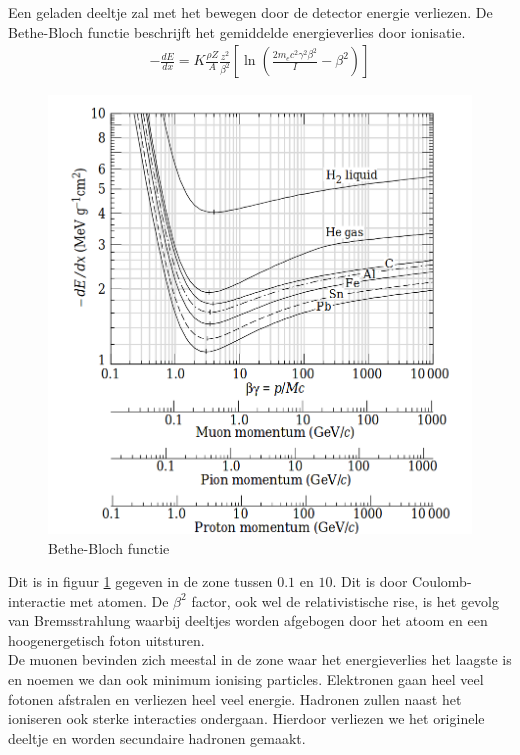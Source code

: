 \documentclass[../main.tex]{subfiles}
\begin{document}
Een geladen deeltje zal met het bewegen door de detector energie verliezen. De Bethe-Bloch functie beschrijft het gemiddelde energieverlies door ionisatie.
\begin{equation}
    \begin{aligned}
        \label{eq:bethe_bloch}
        -\frac{dE}{dx}=K\frac{\rho Z}{A}\frac{z^2}{\beta^2}\left[\ln\left(\frac{2m_ec^2\gamma^2\beta^2}{I}-\beta^2\right)\right]
    \end{aligned}
\end{equation}

\begin{figure}[h]
    \centering
    \includegraphics[width=0.8\linewidth]{introduction_and_review/bethe_bloch.png}
    \caption{Bethe-Bloch functie}%
    \label{fig:bethe_bloch}
\end{figure}
Dit is in figuur \ref{fig:bethe_bloch} gegeven in de zone tussen $0.1$ en $10$. Dit is door Coulomb-interactie met atomen. De $\beta^2$ factor, ook wel de relativistische rise, is het gevolg van Bremsstrahlung waarbij deeltjes worden afgebogen door het atoom en een hoogenergetisch foton uitsturen.\\
De muonen bevinden zich meestal in de zone waar het energieverlies het laagste is en noemen we dan ook minimum ionising particles. Elektronen gaan heel veel fotonen afstralen en verliezen heel veel energie. Hadronen zullen naast het ioniseren ook sterke interacties ondergaan. Hierdoor verliezen we het originele deeltje en worden secundaire hadronen gemaakt.
\end{document}
